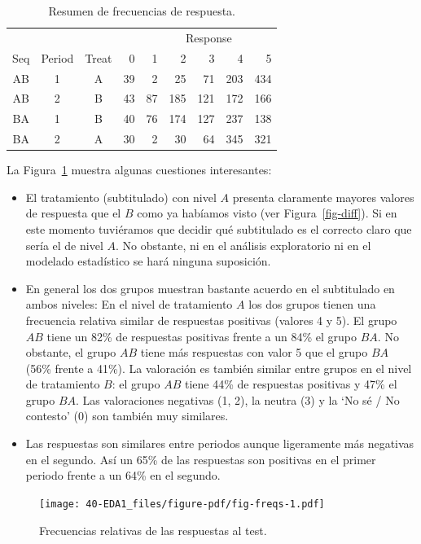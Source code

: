\documentclass[
  12pt,
  a4paper,
  extrafontsizes,
  onecolumn,
  openright]{memoir}
\begin{document}
\hypertarget{tbl-resume}{}
\begin{longtable}{cccrrrrrr}
\caption{\label{tbl-resume}Resumen de frecuencias de respuesta. }\tabularnewline

\toprule
 &  &  &  & \multicolumn{5}{c}{Response} \\ 
\cmidrule(lr){5-9}
Seq & Period & Treat & 0 & 1 & 2 & 3 & 4 & 5 \\ 
\midrule
AB & 1 & A & 39 & 2 & 25 & 71 & 203 & 434 \\ 
AB & 2 & B & 43 & 87 & 185 & 121 & 172 & 166 \\ 
BA & 1 & B & 40 & 76 & 174 & 127 & 237 & 138 \\ 
BA & 2 & A & 30 & 2 & 30 & 64 & 345 & 321 \\ 
\bottomrule
\end{longtable}

La Figura~\ref{fig-freqs} muestra algunas cuestiones interesantes:

\begin{itemize}
\item
  El tratamiento (subtitulado) con nivel \(A\) presenta claramente
  mayores valores de respuesta que el \(B\) como ya habíamos visto (ver
  Figura~\ref{fig-diff}). Si en este momento tuviéramos que decidir qué
  subtitulado es el correcto claro que sería el de nivel \(A\). No
  obstante, ni en el análisis exploratorio ni en el modelado estadístico
  se hará ninguna suposición.
\item
  En general los dos grupos muestran bastante acuerdo en el subtitulado
  en ambos niveles: En el nivel de tratamiento \(A\) los dos grupos
  tienen una frecuencia relativa similar de respuestas positivas
  (valores 4 y 5). El grupo \(AB\) tiene un 82\% de respuestas positivas
  frente a un 84\% el grupo \(BA\). No obstante, el grupo \(AB\) tiene
  más respuestas con valor 5 que el grupo \(BA\) (56\% frente a 41\%).
  La valoración es también similar entre grupos en el nivel de
  tratamiento \(B\): el grupo \(AB\) tiene 44\% de respuestas positivas
  y 47\% el grupo \(BA\). Las valoraciones negativas (1, 2), la neutra
  (3) y la \enquote*{No sé / No contesto} (0) son también muy similares.
\item
  Las respuestas son similares entre periodos aunque ligeramente más
  negativas en el segundo. Así un 65\% de las respuestas son positivas
  en el primer periodo frente a un 64\% en el segundo.
\end{itemize}

\begin{figure}[h]

{\centering \texttt{[image: 40-EDA1\_files/figure-pdf/fig-freqs-1.pdf]}

}

\caption{\label{fig-freqs}Frecuencias relativas de las respuestas al
test.}

\end{figure}
\end{document}
